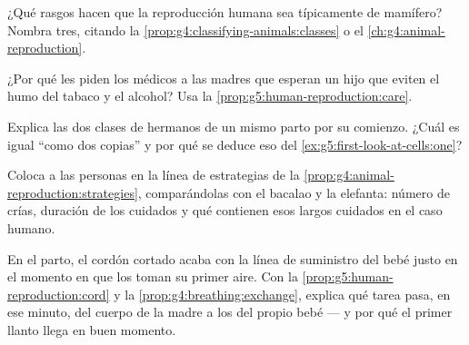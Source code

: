 \begin{exercise}[$\star$]\label{exo:g5:human-reproduction:7}
¿Qué rasgos hacen que la reproducción humana sea típicamente de
mamífero? Nombra tres, citando la
\cref{prop:g4:classifying-animals:classes} o el
\cref{ch:g4:animal-reproduction}.
\end{exercise}

\begin{exercise}[$\star$]\label{exo:g5:human-reproduction:8}
¿Por qué les piden los médicos a las madres que esperan un hijo que
eviten el humo del tabaco y el alcohol? Usa la
\cref{prop:g5:human-reproduction:care}.
\end{exercise}

\begin{exercise}[$\star\star$]\label{exo:g5:human-reproduction:9}
Explica las dos clases de hermanos de un mismo parto por su comienzo.
¿Cuál es igual ``como dos copias'' y por qué se deduce eso del
\cref{ex:g5:first-look-at-cells:one}?
\end{exercise}

\begin{exercise}[$\star\star$]\label{exo:g5:human-reproduction:10}
Coloca a las personas en la línea de estrategias de la
\cref{prop:g4:animal-reproduction:strategies}, comparándolas con el
bacalao y la elefanta: número de crías, duración de los cuidados y qué
contienen esos largos cuidados en el caso humano.
\end{exercise}

\begin{exercise}[$\star\star\star$]\label{exo:g5:human-reproduction:11}
En el parto, el cordón cortado acaba con la línea de suministro del
bebé justo en el momento en que los  toman su primer aire. Con
la \cref{prop:g5:human-reproduction:cord} y la
\cref{prop:g4:breathing:exchange}, explica qué tarea pasa, en ese
minuto, del cuerpo de la madre a los  del propio bebé --- y
por qué el primer llanto llega en buen momento.
\end{exercise}
